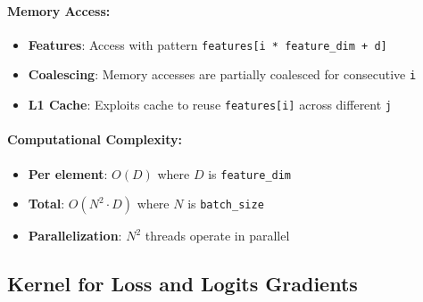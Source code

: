 \documentclass[a4paper,11pt]{article}
\begin{document}
\paragraph{Memory Access:}
\begin{itemize}
    \item \textbf{Features}: Access with pattern \texttt{features[i * feature\_dim + d]}
    \item \textbf{Coalescing}: Memory accesses are partially coalesced for consecutive \texttt{i}
    \item \textbf{L1 Cache}: Exploits cache to reuse \texttt{features[i]} across different \texttt{j}
\end{itemize}

\paragraph{Computational Complexity:}
\begin{itemize}
    \item \textbf{Per element}: $O(D)$ where $D$ is \texttt{feature\_dim}
    \item \textbf{Total}: $O(N^2 \cdot D)$ where $N$ is \texttt{batch\_size}
    \item \textbf{Parallelization}: $N^2$ threads operate in parallel
\end{itemize}

\subsection{Kernel for Loss and Logits Gradients}
\end{document}
